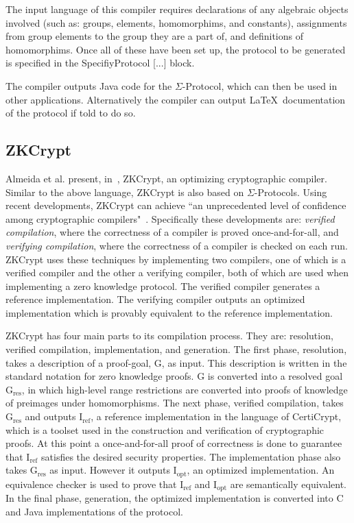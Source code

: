 \documentclass{sig-alternate}
\begin{document}
		The input language of this compiler requires declarations of any
		algebraic objects involved (such as: groups, elements, homomorphims, and
		constants), assignments from group elements to the group
		they are a part of, and definitions of homomorphims. Once all of these
		have been set up, the protocol to be generated is specified in the
		SpecifiyProtocol [...] block.
		
		The compiler outputs Java code for the $\Sigma$-Protocol, which
		can then be used in other applications. Alternatively the compiler
		can output \LaTeX~documentation of the protocol if told to do so.
		
	\subsection{ZKCrypt}
		Almeida et al. present, in~\cite{ZKCrypt:2012}, ZKCrypt, an optimizing cryptographic
		compiler. Similar to the above language, ZKCrypt is also based on $\Sigma$-Protocols.
		Using recent developments, ZKCrypt can achieve ``an unprecedented level of confidence
		among cryptographic compilers"~\cite{ZKCrypt:2012}. Specifically these developments are:
		\textit{verified compilation}, where the correctness of a compiler is proved once-and-for-all,
		and \textit{verifying compilation}, where the correctness of a compiler is checked on
		each run. ZKCrypt uses these techniques by implementing two compilers, one of which
		is a verified compiler and the other a verifying compiler, both of which are used when
		implementing a zero knowledge protocol. The verified compiler generates
		a reference implementation. The verifying compiler outputs an optimized implementation
		which is provably equivalent to the reference implementation. 
		
		ZKCrypt has four main parts to its compilation process. They are: resolution, verified
		compilation, implementation, and generation. The first phase, resolution, takes a
		description of a proof-goal, G, as input. This description is written in the standard
		notation for zero knowledge proofs. G is converted into a resolved goal
		G$_{\textrm{res}}$, in which
		high-level range restrictions are converted into proofs of knowledge of preimages under
		homomorphisms. The next phase, verified compilation, takes G$_{\textrm{res}}$ and 
		outputs I$_{\textrm{ref}}$,
		a reference implementation in the language of CertiCrypt, which is a toolset used in
		the construction and verification of cryptographic proofs. At this point a 
		once-and-for-all proof of correctness is done to guarantee that I$_{\textrm{ref}}$
		satisfies the desired security properties. The implementation phase
		also takes G$_{\textrm{res}}$ as input. However it outputs I$_{\textrm{opt}}$, an
		optimized implementation. An equivalence checker is used to prove that I$_{\textrm{ref}}$
		and I$_{\textrm{opt}}$ are semantically equivalent. In the final phase, generation,
		the optimized implementation is converted into C and Java implementations of the
		protocol.
		
\end{document}
